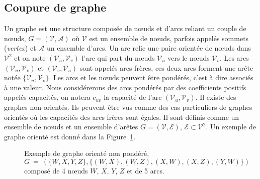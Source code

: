 \documentclass[../main/These_Mathias_Paget.tex]{subfiles}
\begin{document}
\subsection{Coupure de graphe}
	Un graphe est une structure composée de nœuds et d'arcs reliant un couple de nœuds, $G=(\boldsymbol{\mathcal{V}},\boldsymbol{\mathcal{A}})$ où $\boldsymbol{\mathcal{V}}$ est un ensemble de nœuds, parfois appelés sommets (\textit{vertex}) et $\boldsymbol{\mathcal{A}}$ un ensemble d'arcs. Un arc relie une paire orientée de nœuds dans $\boldsymbol{\mathcal{V}}^2 $ et on note $(\mathcal{V}_u,\mathcal{V}_v)$ l'arc qui part du nœuds $\mathcal{V}_u$ vers le nœuds $\mathcal{V}_v$. Les arcs $(\mathcal{V}_u,\mathcal{V}_v)$ et $(\mathcal{V}_v,\mathcal{V}_u)$ sont appelés arcs frères, ces deux arcs forment une arête notée $\{\mathcal{V}_u,\mathcal{V}_v\}$. Les arcs et les nœuds peuvent être pondérés, c'est à dire associés à une valeur. Nous considérerons des arcs pondérés par des coefficients positifs appelés capacités, on notera $c_{uv}$ la capacité de l'arc $(\mathcal{V}_u,\mathcal{V}_v)$. Il existe des graphes non-orientés. Ils peuvent être vus comme des cas particuliers de graphes orientés où les capacités des arcs frères sont égales. Il sont définis comme un ensemble de nœuds et un ensemble d'arêtes $G=(\boldsymbol{\mathcal{V}},\boldsymbol{\mathcal{E}})$, $\boldsymbol{\mathcal{E}} \subset \boldsymbol{\mathcal{V}}^2$. Un exemple de graphe orienté est donné dans la Figure~\ref{fig:graph_ex}.
	
\begin{figure}
\begin{center}
\end{center}
\caption{Exemple de graphe orienté non pondéré, $G~=~(\{W,X,Y,Z\},\{(W,X), (W,Z), (X,W), (X,Z), (Y,W)\})$ composé de 4 nœuds $W$, $X$, $Y$, $Z$ et de 5 arcs.}
\label{fig:graph_ex}
\end{figure}
\end{document}
